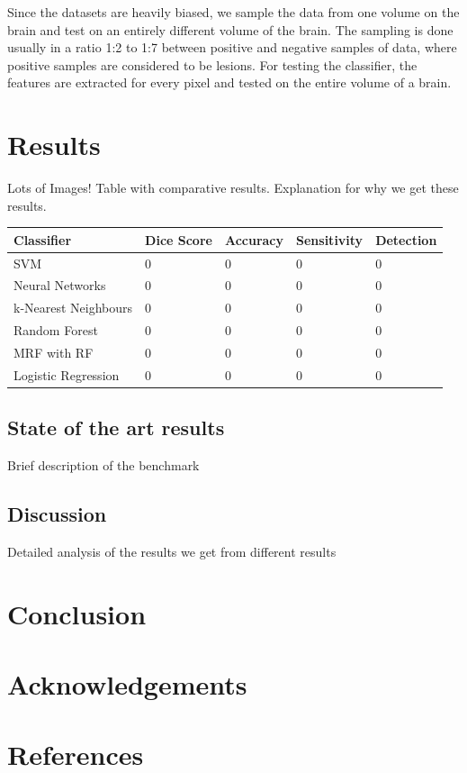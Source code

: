 \documentclass{article} %
\begin{document}
Since the datasets are heavily biased, we sample the data from one volume on the brain and test on an entirely different volume of the brain. The sampling is done usually in a ratio 1:2 to 1:7 between positive and negative samples of data, where positive samples are considered to be lesions. For testing the classifier, the features are extracted for every pixel and tested on the entire volume of a brain.  

\section{Results}
Lots of Images! Table with comparative results. Explanation for why we get these results. 

\begin{center}
\centering
\begin{tabular}{ | m{7em} | m{2cm}| m{2cm} | m{2cm} | m{2cm} | } 
\hline
\textbf{Classifier} & \textbf{Dice Score} & \textbf{Accuracy} & \textbf{Sensitivity} & \textbf{Detection}\\ 
\hline
SVM & 0 & 0 & 0 & 0  \\ 
\hline
Neural Networks & 0 & 0 & 0 & 0 \\ 
\hline
k-Nearest Neighbours & 0 & 0 & 0 & 0 \\ 
\hline
Random Forest & 0 & 0 & 0 & 0 \\ 
\hline
MRF with RF & 0 & 0 & 0 & 0 \\ 
\hline
Logistic Regression & 0 & 0 & 0 & 0 \\ 
\hline
\end{tabular}
\end{center}

\subsection{State of the art results}
Brief description of the benchmark

\subsection{Discussion}
Detailed analysis of the results we get from different results

\section{Conclusion}

\section{Acknowledgements}

\section{References}



\end{document}
